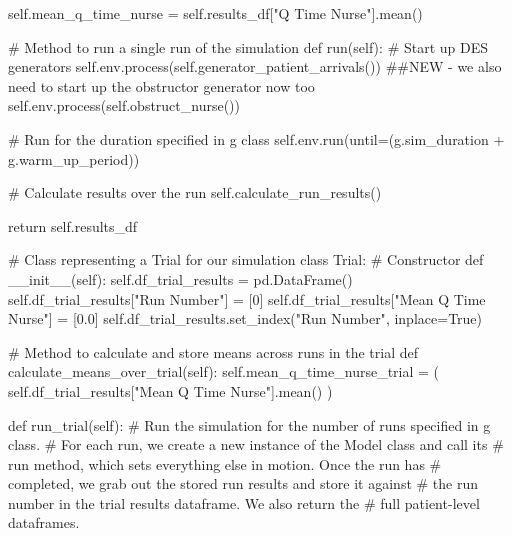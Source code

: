 \documentclass[
  letterpaper,
  DIV=11,
  numbers=noendperiod]{scrreprt}
\newenvironment{Shaded}{}{}
\newcommand{\CommentTok}[1]{\textcolor[rgb]{0.42,0.45,0.49}{#1}}
\newcommand{\ControlFlowTok}[1]{\textcolor[rgb]{0.84,0.23,0.29}{#1}}
\newcommand{\DecValTok}[1]{\textcolor[rgb]{0.00,0.36,0.77}{#1}}
\newcommand{\FloatTok}[1]{\textcolor[rgb]{0.00,0.36,0.77}{#1}}
\newcommand{\FunctionTok}[1]{\textcolor[rgb]{0.44,0.26,0.76}{#1}}
\newcommand{\KeywordTok}[1]{\textcolor[rgb]{0.84,0.23,0.29}{#1}}
\newcommand{\NormalTok}[1]{\textcolor[rgb]{0.14,0.16,0.18}{#1}}
\newcommand{\OperatorTok}[1]{\textcolor[rgb]{0.14,0.16,0.18}{#1}}
\newcommand{\StringTok}[1]{\textcolor[rgb]{0.01,0.18,0.38}{#1}}
\newcommand{\VariableTok}[1]{\textcolor[rgb]{0.89,0.38,0.04}{#1}}
\begin{document}
\begin{tcolorbox}
\begin{Shaded}
\begin{Highlighting}[]
        \VariableTok{self}\NormalTok{.mean\_q\_time\_nurse }\OperatorTok{=} \VariableTok{self}\NormalTok{.results\_df[}\StringTok{"Q Time Nurse"}\NormalTok{].mean()}

    \CommentTok{\# Method to run a single run of the simulation}
    \KeywordTok{def}\NormalTok{ run(}\VariableTok{self}\NormalTok{):}
        \CommentTok{\# Start up DES generators}
        \VariableTok{self}\NormalTok{.env.process(}\VariableTok{self}\NormalTok{.generator\_patient\_arrivals())}
        \CommentTok{\#\#NEW {-} we also need to start up the obstructor generator now too}
        \VariableTok{self}\NormalTok{.env.process(}\VariableTok{self}\NormalTok{.obstruct\_nurse())}

        \CommentTok{\# Run for the duration specified in g class}
        \VariableTok{self}\NormalTok{.env.run(until}\OperatorTok{=}\NormalTok{(g.sim\_duration }\OperatorTok{+}\NormalTok{ g.warm\_up\_period))}

        \CommentTok{\# Calculate results over the run}
        \VariableTok{self}\NormalTok{.calculate\_run\_results()}

        \ControlFlowTok{return} \VariableTok{self}\NormalTok{.results\_df}

\CommentTok{\# Class representing a Trial for our simulation}
\KeywordTok{class}\NormalTok{ Trial:}
    \CommentTok{\# Constructor}
    \KeywordTok{def}  \FunctionTok{\_\_init\_\_}\NormalTok{(}\VariableTok{self}\NormalTok{):}
        \VariableTok{self}\NormalTok{.df\_trial\_results }\OperatorTok{=}\NormalTok{ pd.DataFrame()}
        \VariableTok{self}\NormalTok{.df\_trial\_results[}\StringTok{"Run Number"}\NormalTok{] }\OperatorTok{=}\NormalTok{ [}\DecValTok{0}\NormalTok{]}
        \VariableTok{self}\NormalTok{.df\_trial\_results[}\StringTok{"Mean Q Time Nurse"}\NormalTok{] }\OperatorTok{=}\NormalTok{ [}\FloatTok{0.0}\NormalTok{]}
        \VariableTok{self}\NormalTok{.df\_trial\_results.set\_index(}\StringTok{"Run Number"}\NormalTok{, inplace}\OperatorTok{=}\VariableTok{True}\NormalTok{)}

    \CommentTok{\# Method to calculate and store means across runs in the trial}
    \KeywordTok{def}\NormalTok{ calculate\_means\_over\_trial(}\VariableTok{self}\NormalTok{):}
        \VariableTok{self}\NormalTok{.mean\_q\_time\_nurse\_trial }\OperatorTok{=}\NormalTok{ (}
            \VariableTok{self}\NormalTok{.df\_trial\_results[}\StringTok{"Mean Q Time Nurse"}\NormalTok{].mean()}
\NormalTok{        )}

    \KeywordTok{def}\NormalTok{ run\_trial(}\VariableTok{self}\NormalTok{):}
        \CommentTok{\# Run the simulation for the number of runs specified in g class.}
        \CommentTok{\# For each run, we create a new instance of the Model class and call its}
        \CommentTok{\# run method, which sets everything else in motion.  Once the run has}
        \CommentTok{\# completed, we grab out the stored run results and store it against}
        \CommentTok{\# the run number in the trial results dataframe. We also return the}
        \CommentTok{\# full patient{-}level dataframes.}


\end{Highlighting}
\end{Shaded}
\end{tcolorbox}
\end{document}
